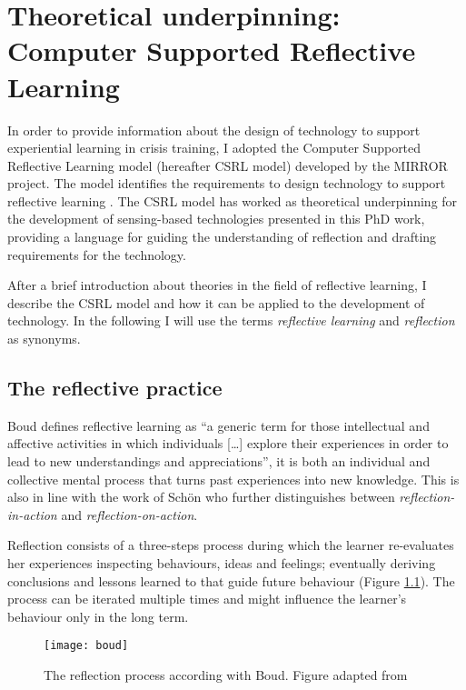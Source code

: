\chapter[Theoretical underpinning:\\ Computer Supported Reflective Learning]{Theoretical underpinning: Computer Supported Reflective Learning}\label{csrl}

In order to provide information about the design of technology to support experiential learning in crisis training, I adopted the Computer Supported Reflective Learning model (hereafter CSRL model) developed by the MIRROR project. The model identifies the requirements to design technology to support reflective learning \autocite{Krogstie:2013kf}. The CSRL model has worked as theoretical underpinning for the development of sensing-based technologies presented in this PhD work, providing a language for guiding the understanding of reflection and drafting requirements for the technology.

After a brief introduction about theories in the field of reflective learning, I describe the CSRL model and how it can be applied to the development of technology. In the following I will use the terms \emph{reflective learning} and \emph{reflection} as synonyms.

\section{The reflective practice}\label{reflection}

Boud \autocite*{boud1985reflection} defines reflective learning as ``a generic term for those intellectual and affective activities in which individuals {[}\ldots{}{]} explore their experiences in order to lead to new understandings and appreciations'', it is both an individual and collective mental process that turns past experiences into new knowledge. This is also in line with the work of Sch\"on \autocite*{Schon:1983ut} who further distinguishes between \emph{reflection-in-action} and \emph{reflection-on-action}.

Reflection consists of a three-steps process during which the learner re-evaluates her experiences inspecting behaviours, ideas and feelings; eventually deriving conclusions and lessons learned to that guide future behaviour (Figure \ref{fig:boud-model}). The process can be iterated multiple times and might influence the learner's behaviour only in the long term.

\begin{figure}
	[tbh] \centering 
	\texttt{[image: boud]} \caption{The reflection process according with Boud. Figure adapted from \protect\autocite{boud1985reflection}} \label{fig:boud-model} 
\end{figure}

